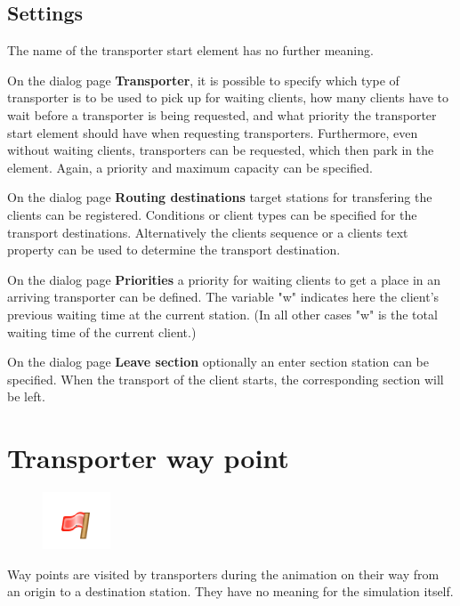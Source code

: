 \subsection*{Settings}

The name of the transporter start element has no further meaning.

On the dialog page \textbf{Transporter}, it is possible to specify which type
of transporter is to be used to pick up for waiting clients, how many clients
have to wait before a transporter is being requested, and what priority the
transporter start element should have when requesting transporters.
Furthermore, even without waiting clients, transporters can be requested,
which then park in the element. Again, a priority and maximum capacity can be specified.

On the dialog page \textbf{Routing destinations} target stations for transfering the
clients can be registered. Conditions or client types can be specified for the transport
destinations. Alternatively the clients sequence or a clients text property can be used to determine
the transport destination.

On the dialog page \textbf{Priorities} a priority for waiting clients
to get a place in an arriving transporter can be defined.
The variable "w" indicates here the client's previous waiting time at the current station.
(In all other cases "w" is the total waiting time of the current client.)

On the dialog page \textbf{Leave section} optionally an enter section station can be specified.
When the transport of the client starts, the corresponding section will be left.


\section{Transporter way point}
\label{ref:ModelElementWayPoint}

\begin{figure}
\vspace{-22pt}
\includegraphics[width=2cm]{imageModelElementWayPoint.png}
\vspace{-22pt}
\end{figure}

Way points are visited by transporters during the animation on their way from an 
origin to a destination station. They have no meaning for the simulation itself.

